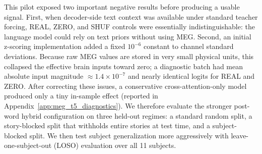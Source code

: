 \documentclass{article}
\theoremstyle{plain}
\theoremstyle{definition}
\theoremstyle{remark}
\begin{document}
This pilot exposed two important negative results before producing a usable signal.
First, when decoder-side text context was available under standard teacher forcing, REAL, ZERO, and SHUF controls were essentially indistinguishable: the language model could rely on text priors without using MEG.
Second, an initial z-scoring implementation added a fixed $10^{-6}$ constant to channel standard deviations.
Because raw MEG values are stored in very small physical units, this collapsed the effective brain inputs toward zero; a diagnostic batch had mean absolute input magnitude $\approx 1.4\times 10^{-7}$ and nearly identical logits for REAL and ZERO.
After correcting these issues, a conservative cross-attention-only model produced only a tiny in-sample effect (reported in Appendix~\ref{app:meg_t5_diagnostics}).
We therefore evaluate the stronger post-word hybrid configuration on three held-out regimes: a standard random split, a story-blocked split that withholds entire stories at test time, and a subject-blocked split. We then test subject generalization more aggressively with leave-one-subject-out (LOSO) evaluation over all 11 subjects.

\begin{table}[t]
\centering
\caption{Held-out MEG-MASC/T5 results for the post-word hybrid model (target-only decoding, per-example brain normalization). REAL uses the matched MEG window, ZERO removes the MEG input, and SHUF permutes MEG windows across examples. Negative $\Delta$NLL means REAL is better.}
\label{tab:megmasc_t5}
\end{table}
\end{document}
